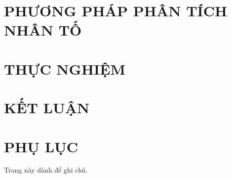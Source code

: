 \documentclass[a4paper, oneside]{report}
\theoremstyle{plain}
\theoremstyle{plain}
\begin{document}
\chapter[PHƯƠNG PHÁP PHÂN TÍCH NHÂN TỐ]{PHƯƠNG PHÁP PHÂN TÍCH NHÂN TỐ}\label{chap.2}

\chapter{THỰC NGHIỆM}\label{chap.3}

\chapter{KẾT LUẬN}\label{chap.4}


\chapter{PHỤ LỤC}\label{phuluc}


\clearpage


\clearpage
\printindex

\begin{titlepage}
\begin{center}
	Trang này dành để ghi chú.
\end{center}
\end{titlepage}
\end{document}

